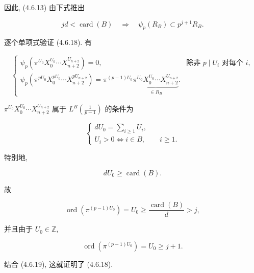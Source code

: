 因此, (4.6.13) 由下式推出

\begin{equation}\tag{4.6.18}
jd<\operatorname{card}(B)
\quad\Longrightarrow\quad
\psi_p(R_B)\subset p^{j+1}R_B.
\end{equation}

逐个单项式验证 (4.6.18). 有

\begin{equation}\tag{4.6.19}
\begin{cases}
\psi_p\!\left(\pi^{U_0}X_0^{U_0}\cdots X_{n+2}^{U_{n+2}}\right)=0,
&\text{除非 }p\mid U_i\text{ 对每个 }i,\\[3pt]
\psi_p\!\left(
\pi^{pU_0}X_0^{pU_0}\cdots X_{n+2}^{pU_{n+2}}
\right)
=\pi^{(p-1)U_0}
\underbrace{\pi^{U_0}X_0^{U_0}\cdots X_{n+2}^{U_{n+2}}}_{\in R_B}.
\end{cases}
\end{equation}

$\pi^{U_0}X_0^{U_0}\cdots X_{n+2}^{U_{n+2}}$ 属于
$L^B\!\left(\frac1{p-1}\right)$ 的条件为

\begin{equation}\tag{4.6.20}
\begin{cases}
dU_0=\displaystyle\sum_{i\geq1}U_i,\\
U_i>0\Longleftrightarrow i\in B,\qquad i\geq1.
\end{cases}
\end{equation}

特别地,

\begin{equation}\tag{4.6.21}
dU_0\geq\operatorname{card}(B).
\end{equation}

故

\begin{equation}\tag{4.6.22}
\operatorname{ord}\!\left(\pi^{(p-1)U_0}\right)
=U_0\geq\frac{\operatorname{card}(B)}d>j,
\end{equation}

并且由于 $U_0\in\mathbb Z$,

\begin{equation}\tag{4.6.23}
\operatorname{ord}\!\left(\pi^{(p-1)U_0}\right)
=U_0\geq j+1.
\end{equation}

结合 (4.6.19), 这就证明了 (4.6.18).

